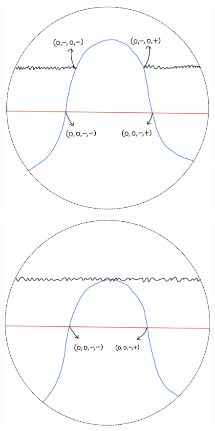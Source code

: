 \begin{definition}
\begin{enumerate}
\begin{itemize}
\begin{figure}[H]
    \centering
    \includegraphics[scale = 0.95]{diagrams/lemma2/17.png} 
    \caption{}
    \label{fig:your-label}
\end{figure}
\begin{figure}[H]
    \centering
    \includegraphics[scale = 0.95]{diagrams/lemma2/18.png} 

\end{figure}
\end{itemize}
\end{enumerate}
\end{definition}
